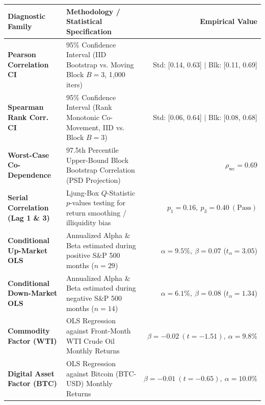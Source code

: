 \documentclass[10pt,a4paper]{article}
\begin{document}
\vspace{0.3em}
\noindent{\color{goldaccent}\rule{\textwidth}{1.2pt}}
\vspace{0.5em}

\begin{tcolorbox}[colback=white, colframe=primary, title=\textbf{\small\strut Appendix A: Extended Statistical, Bootstrap \& Factor Diagnostics}, fonttitle=\sffamily\bfseries\small, arc=5pt, boxrule=0.8pt, toptitle=4pt, bottomtitle=4pt, left=6pt, right=6pt, top=4pt, bottom=4pt, colbacktitle=primary]
\renewcommand{\arraystretch}{1.25}
\scriptsize
\begin{tabularx}{\textwidth}{l X r}
\toprule
\textbf{\textcolor{primary}{Diagnostic Family}} & \textbf{\textcolor{primary}{Methodology / Statistical Specification}} & \textbf{\textcolor{primary}{Empirical Value}} \\
\midrule
\textbf{Pearson Correlation CI} & 95\% Confidence Interval (IID Bootstrap vs. Moving Block $B=3$, 1,000 iters) & Std: [0.14, 0.63] $\vert$ Blk: [0.11, 0.69] \\
\rowcolor{cardbg} \textbf{Spearman Rank Corr. CI} & 95\% Confidence Interval (Rank Monotonic Co-Movement, IID vs. Block $B=3$) & Std: [0.06, 0.64] $\vert$ Blk: [0.08, 0.68] \\
\textbf{Worst-Case Co-Dependence} & 97.5th Percentile Upper-Bound Block Bootstrap Correlation (PSD Projection) & $\rho_{\text{wc}} = 0.69$ \\
\rowcolor{cardbg} \textbf{Serial Correlation (Lag 1 \& 3)} & Ljung-Box $Q$-Statistic $p$-values testing for return smoothing / illiquidity bias & $p_1=0.16,\ p_3=0.40\ (\text{Pass})$ \\
\textbf{Conditional Up-Market OLS} & Annualized Alpha \& Beta estimated during positive S\&P 500 months ($n=29$) & $\alpha=9.5\%,\ \beta=0.07$ ($t_\alpha=3.05$) \\
\rowcolor{cardbg} \textbf{Conditional Down-Market OLS} & Annualized Alpha \& Beta estimated during negative S\&P 500 months ($n=14$) & $\alpha=6.1\%,\ \beta=0.08$ ($t_\alpha=1.34$) \\
\textbf{Commodity Factor (WTI)} & OLS Regression against Front-Month WTI Crude Oil Monthly Returns & $\beta=-0.02\ (t=-1.51),\ \alpha=9.8\%$ \\
\rowcolor{cardbg} \textbf{Digital Asset Factor (BTC)} & OLS Regression against Bitcoin (BTC-USD) Monthly Returns & $\beta=-0.01\ (t=-0.65),\ \alpha=10.0\%$ \\
\bottomrule
\end{tabularx}
\end{tcolorbox}
\end{document}
